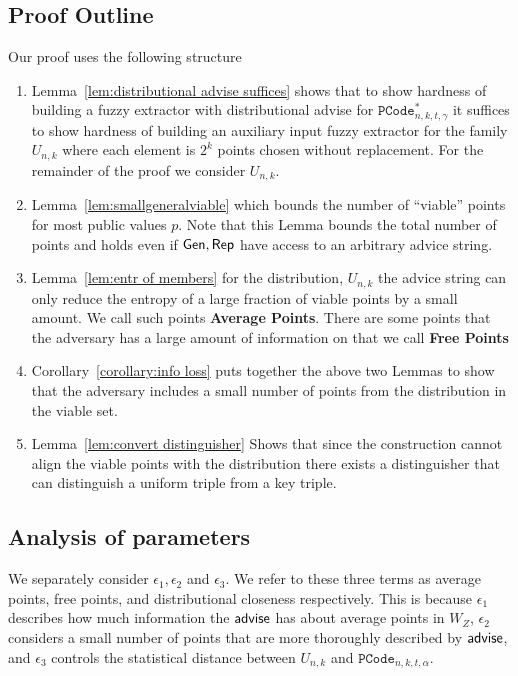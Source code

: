 \subsection{Proof Outline}
Our proof uses the following structure
\begin{enumerate}

\item Lemma~\ref{lem:distributional advise suffices} shows that to show hardness of building a fuzzy extractor with distributional advise for $\mathtt{PCode}_{n, k, t, \gamma}^{*}$ it suffices to show hardness of building an auxiliary input fuzzy extractor for the family $U_{n,k}$ where each element is $2^k$ points chosen without replacement. For the remainder of the proof we consider $U_{n,k}$.

\item Lemma~\ref{lem:smallgeneralviable} which bounds the number of ``viable'' points for most public values $p$.  Note that this Lemma bounds the total number of points and holds even if ${\mathsf{Gen}}, {\mathsf{Rep}}$ have access to an arbitrary advice string. 

\item Lemma~\ref{lem:entr of members} for the distribution, $U_{n,k}$ the advice string can only reduce the entropy of a large fraction of viable points by a small amount. We call such points \textbf{Average Points}.  There are some points that the adversary has a large amount of information on that we call \textbf{Free Points}

\item Corollary~\ref{corollary:info loss} puts together the above two Lemmas to show that the adversary includes a small number of points from the distribution in the viable set.

\item Lemma~\ref{lem:convert distinguisher} Shows that since the construction cannot align the viable points with the distribution there exists a distinguisher that can distinguish a uniform triple from a key triple. 
\end{enumerate}

\subsection{Analysis of parameters}
We separately consider $\epsilon_1, \epsilon_2$ and $\epsilon_3$. We refer to these three terms as average points, free points, and distributional closeness respectively. This is because $\epsilon_1$ describes how much information the ${\mathsf{advise}}$ has about average points in $W_Z$, $\epsilon_2$ considers a small number of points that are more thoroughly described by ${\mathsf{advise}}$, and $\epsilon_3$ controls the statistical distance between $U_{n, k}$ and $\mathtt{PCode}_{n, k, t, \alpha}$.



